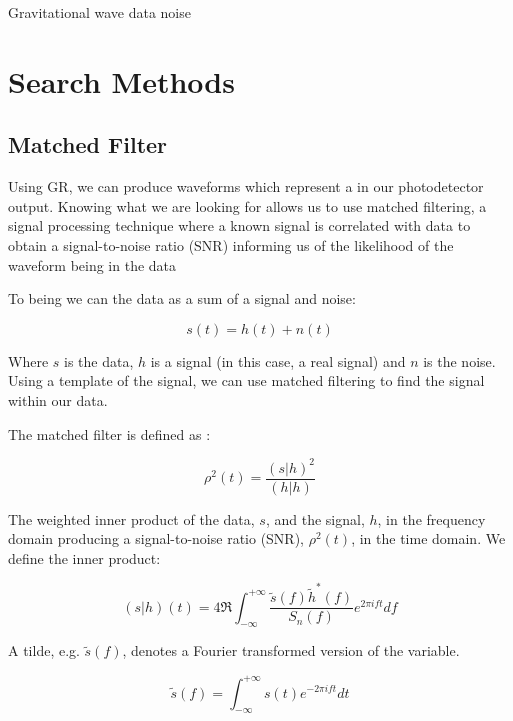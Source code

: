 Gravitational wave data noise 

\section{\label{2:sec:search-methods}Search Methods}

\subsection{\label{2:sec:matched-filter}Matched Filter}

Using GR, we can produce waveforms which represent a \gw in our photodetector output. Knowing what we are looking for allows us to use matched filtering, a signal processing technique where a known signal is correlated with data to
obtain a signal-to-noise ratio (SNR) informing us of the likelihood of the waveform being in the data

To being we can the data as a sum of a signal and noise:

\begin{equation}
   s(t) = h(t) + n(t)
   \label{2:eqn:s_h_n}
\end{equation}

Where $s$ is the data, $h$ is a signal (in this case, a real \gw signal) and $n$ is the noise. Using a template of the signal, we can use matched filtering to find the signal within our data.

The matched filter is defined as \cite{PyCBC:2016}:

\begin{equation}
   \rho^2(t) = \frac{(s|h)^2}{(h|h)}
   \label{2:eqn:matched_filter}
\end{equation}

The weighted inner product of the data, $s$, and the signal, $h$, in the frequency domain producing a signal-to-noise ratio (SNR), $\rho^2(t)$, in the time domain. We define the inner product:

\begin{equation}
   (s|h)(t) = 4 \Re \int^{+\infty}_{-\infty} \frac{\tilde{s}(f) \tilde{h}^*(f)}{S_n(f)} e^{2 \pi i f t} df
   \label{2:eqn:inner_product}
\end{equation}

A tilde, e.g. $\tilde{s}(f)$, denotes a Fourier transformed version of the variable.

\begin{equation}
   \tilde{s}(f) = \int^{+\infty}_{-\infty} s(t) e^{-2 \pi i f t} dt
   \label{2:eqn:fourier_transform}
\end{equation}

